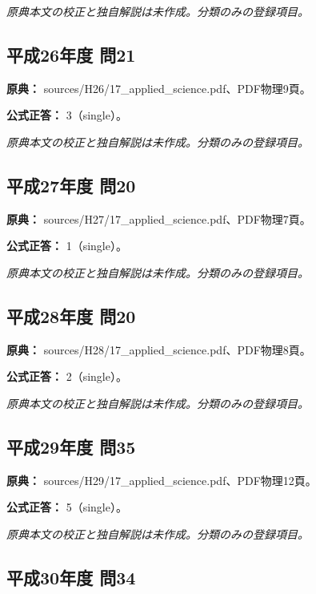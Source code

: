 \par\textit{原典本文の校正と独自解説は未作成。分類のみの登録項目。}

\subsection{平成26年度 問21}
\label{q:h26-reg-applied-21}

\noindent\textbf{原典：} sources/H26/17\_applied\_science.pdf、PDF物理9頁。

\textbf{公式正答：} 3（single）。

\par\textit{原典本文の校正と独自解説は未作成。分類のみの登録項目。}

\subsection{平成27年度 問20}
\label{q:h27-reg-applied-20}

\noindent\textbf{原典：} sources/H27/17\_applied\_science.pdf、PDF物理7頁。

\textbf{公式正答：} 1（single）。

\par\textit{原典本文の校正と独自解説は未作成。分類のみの登録項目。}

\subsection{平成28年度 問20}
\label{q:h28-reg-applied-20}

\noindent\textbf{原典：} sources/H28/17\_applied\_science.pdf、PDF物理8頁。

\textbf{公式正答：} 2（single）。

\par\textit{原典本文の校正と独自解説は未作成。分類のみの登録項目。}

\subsection{平成29年度 問35}
\label{q:h29-reg-applied-35}

\noindent\textbf{原典：} sources/H29/17\_applied\_science.pdf、PDF物理12頁。

\textbf{公式正答：} 5（single）。

\par\textit{原典本文の校正と独自解説は未作成。分類のみの登録項目。}

\subsection{平成30年度 問34}
\label{q:h30-reg-applied-34}

